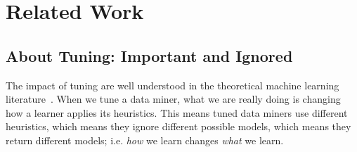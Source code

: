 \documentclass[10pt,conference]{IEEEtran}
\theoremstyle{break}
\begin{document}



\section{Related Work}

\subsection{About Tuning: Important and Ignored}
\label{sect: tuning}

The impact of tuning are well understood in the theoretical machine learning literature~\cite{bergstra2012random}.  When we tune a
data miner, what we are really doing is changing how a learner applies its
heuristics. This means tuned data miners use different heuristics, which means
they ignore different possible models, which means they return different models;
i.e. \textit{how} we learn changes \textit{what} we learn.
\end{document}
